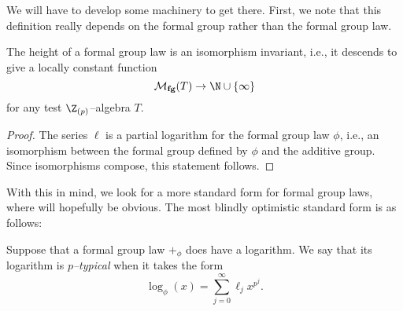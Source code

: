 \noindent We will have to develop some machinery to get there.  First, we note that this definition really depends on the formal group rather than the formal group law.

\begin{lemma}
The height of a formal group law is an isomorphism invariant, i.e., it descends to give a locally constant function \[\moduli{fg}(T) \to \N \cup \{\infty\}\] for any test $\Z_{(p)}$--algebra $T$.
\end{lemma}
\begin{proof}
The series $\ell$ is a partial logarithm for the formal group law $\phi$, i.e., an isomorphism between the formal group defined by $\phi$ and the additive group.  Since isomorphisms compose, this statement follows.
\end{proof}

With this in mind, we look for a more standard form for formal group laws, where  will hopefully be obvious.  The most blindly optimistic standard form is as follows:
\begin{definition}\label{DefnpTypicalLog}
Suppose that a formal group law $+_\phi$ does have a logarithm.  We say that its logarithm is \textit{$p$--typical} when it takes the form \[\log_\phi(x) = \sum_{j=0}^\infty \ell_j x^{p^j}.\]
\end{definition}

